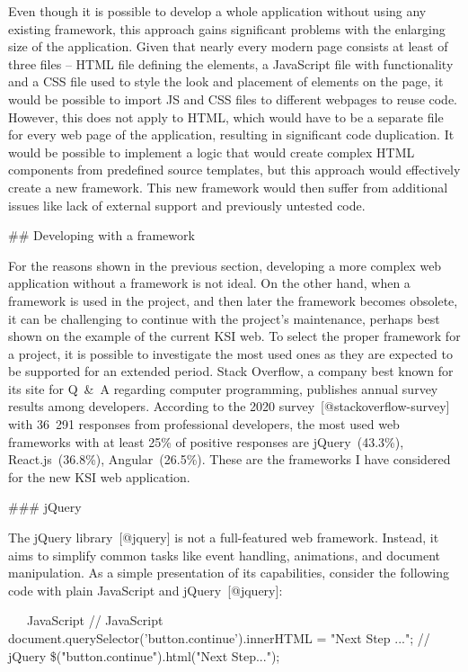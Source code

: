 \documentclass[
  digital, %
  oneside, %
  lof,     %
  nolot,     %
]{fithesis4}
\begin{document}
Even though it is possible to develop a whole application without using any existing framework, this approach gains significant problems with the enlarging size of the application. Given that nearly every modern page consists at least of three files -- HTML file defining the elements, a JavaScript file with functionality and a CSS file used to style the look and placement of elements on the page, it would be possible to import JS and CSS files to different webpages to reuse code. However, this does not apply to HTML, which would have to be a separate file for every web page of the application, resulting in significant code duplication. It would be possible to implement a logic that would create complex HTML components from predefined source templates, but this approach would effectively create a new framework. This new framework would then suffer from additional issues like lack of external support and previously untested code.

## Developing with a framework

For the reasons shown in the previous section, developing a more complex web application without a framework is not ideal. On the other hand, when a framework is used in the project, and then later the framework becomes obsolete, it can be challenging to continue with the project's maintenance, perhaps best shown on the example of the current KSI web. To select the proper framework for a project, it is possible to investigate the most used ones as they are expected to be supported for an extended period. Stack Overflow, a company best known for its site for Q~\&~A regarding computer programming, publishes annual survey results among developers. According to the 2020 survey~[@stackoverflow-survey] with 36~291 responses from professional developers, the most used web frameworks with at least 25\% of positive responses are jQuery~(43.3\%), React.js~(36.8\%), Angular~(26.5\%). These are the frameworks I have considered for the new KSI web application.

### jQuery

The jQuery library~[@jquery] is not a full-featured web framework. Instead, it aims to simplify common tasks like event handling, animations, and document manipulation. As a simple presentation of its capabilities, consider the following code with plain JavaScript and jQuery~[@jquery]:

~~~JavaScript
// JavaScript
document.querySelector('button.continue').innerHTML = "Next Step ...";
// jQuery
\$("button.continue").html("Next Step...");
~~~
\end{document}
